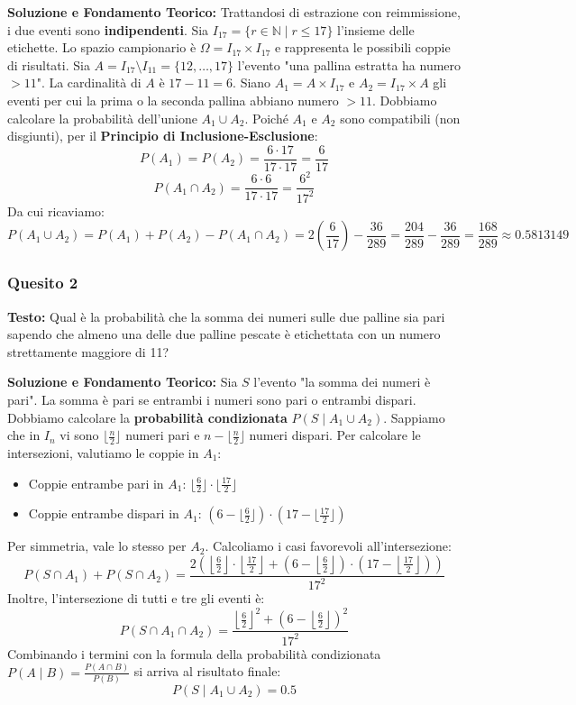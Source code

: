 \documentclass[12pt, a4paper]{article}
\begin{document}
\textbf{Soluzione e Fondamento Teorico:} 
Trattandosi di estrazione con reimmissione, i due eventi sono \textbf{indipendenti}. 
Sia $I_{17} = \{r \in \mathbb{N} \mid r \le 17\}$ l'insieme delle etichette. Lo spazio campionario è $\Omega = I_{17} \times I_{17}$ e rappresenta le possibili coppie di risultati.
Sia $A = I_{17} \setminus I_{11} = \{12, \dots, 17\}$ l'evento "una pallina estratta ha numero $> 11$". La cardinalità di $A$ è $17 - 11 = 6$.
Siano $A_1 = A \times I_{17}$ e $A_2 = I_{17} \times A$ gli eventi per cui la prima o la seconda pallina abbiano numero $> 11$.
Dobbiamo calcolare la probabilità dell'unione $A_1 \cup A_2$. Poiché $A_1$ e $A_2$ sono compatibili (non disgiunti), per il \textbf{Principio di Inclusione-Esclusione}:
$$ P(A_1) = P(A_2) = \frac{6 \cdot 17}{17 \cdot 17} = \frac{6}{17} $$
$$ P(A_1 \cap A_2) = \frac{6 \cdot 6}{17 \cdot 17} = \frac{6^2}{17^2} $$
Da cui ricaviamo:
$$ P(A_1 \cup A_2) = P(A_1) + P(A_2) - P(A_1 \cap A_2) = 2 \left(\frac{6}{17}\right) - \frac{36}{289} = \frac{204}{289} - \frac{36}{289} = \frac{168}{289} \approx 0.5813149 $$

\subsubsection*{Quesito 2}
\textbf{Testo:} Qual è la probabilità che la somma dei numeri sulle due palline sia pari sapendo che almeno una delle due palline pescate è etichettata con un numero strettamente maggiore di 11?

\textbf{Soluzione e Fondamento Teorico:} 
Sia $S$ l'evento "la somma dei numeri è pari". La somma è pari se entrambi i numeri sono pari o entrambi dispari. Dobbiamo calcolare la \textbf{probabilità condizionata} $P(S \mid A_1 \cup A_2)$.
Sappiamo che in $I_n$ vi sono $\lfloor\frac{n}{2}\rfloor$ numeri pari e $n - \lfloor\frac{n}{2}\rfloor$ numeri dispari.
Per calcolare le intersezioni, valutiamo le coppie in $A_1$:
\begin{itemize}
    \item Coppie entrambe pari in $A_1$: $\lfloor\frac{6}{2}\rfloor \cdot \lfloor\frac{17}{2}\rfloor$
    \item Coppie entrambe dispari in $A_1$: $(6 - \lfloor\frac{6}{2}\rfloor) \cdot (17 - \lfloor\frac{17}{2}\rfloor)$
\end{itemize}
Per simmetria, vale lo stesso per $A_2$. Calcoliamo i casi favorevoli all'intersezione:
$$ P(S \cap A_1) + P(S \cap A_2) = \frac{2 \left( \left\lfloor\frac{6}{2}\right\rfloor \cdot \left\lfloor\frac{17}{2}\right\rfloor + \left(6 - \left\lfloor\frac{6}{2}\right\rfloor\right) \cdot \left(17 - \left\lfloor\frac{17}{2}\right\rfloor\right) \right)}{17^2} $$
Inoltre, l'intersezione di tutti e tre gli eventi è:
$$ P(S \cap A_1 \cap A_2) = \frac{ \left\lfloor\frac{6}{2}\right\rfloor^2 + \left(6 - \left\lfloor\frac{6}{2}\right\rfloor\right)^2 }{17^2} $$
Combinando i termini con la formula della probabilità condizionata $P(A \mid B) = \frac{P(A \cap B)}{P(B)}$ si arriva al risultato finale:
$$ P(S \mid A_1 \cup A_2) = 0.5 $$
\end{document}
